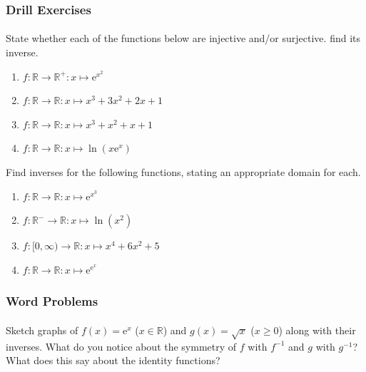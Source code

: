 \documentclass[12pt, a4paper, titlepage, twoside]{article}
\newcommand*{\R}{\mathbb{R}}
\newcommand*{\e}{\textrm{e}}
\begin{document}
	\subsubsection*{Drill Exercises}
	
	\paragraph{}
	 State whether each of the functions below are injective and/or surjective.
	find its inverse.
	
	\begin{multicols}{2}
		\begin{enumerate}[label=\textbf{(\alph*)}]
			\item $f : \R \to \R^+ : x \mapsto \e^{x^2}$
			\item $f : \R \to \R : x \mapsto x^3 + 3x^2 + 2x + 1$
			\item $f : \R \to \R : x \mapsto x^3 + x^2 + x + 1$
			\item $f : \R \to \R : x \mapsto \ln(x\e^x)$
		\end{enumerate}
	\end{multicols}
	
	\newpage	
	
	 Find inverses for the following functions, stating an appropriate domain for each.
	
	\begin{multicols}{2}
		\begin{enumerate}[label=\textbf{(\alph*)}]
			\item $f : \R \to \R: x \mapsto \e^{x^3}$
			\item $f : \R^- \to \R : x \mapsto \ln(x^2)$
			\item $f : [0, \infty) \to \R : x \mapsto x^4 + 6x^2 + 5$
			\item $f : \R \to \R : x \mapsto \e^{\e^x}$
		\end{enumerate}
	\end{multicols}
	
	\hfill
	
	\subsubsection*{Word Problems}
	
	\paragraph{}
	Sketch graphs of $f(x) = \e^x$ ($x \in \R$) and $g(x) = \sqrt{x}$ ($x \geqslant 0$) along with their inverses. What do you notice about
	the symmetry of $f$ with $f^{-1}$ and $g$ with $g^{-1}$? What does this say about the identity functions? 
	
\end{document}
